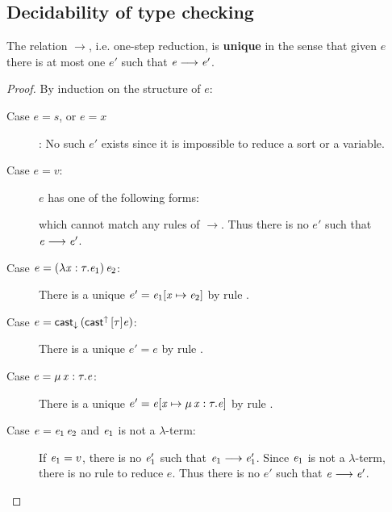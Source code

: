 \subsection{Decidability of type checking}
\begin{lem}\label{lem:unired}
	The relation $ \longrightarrow $, i.e. one-step reduction, is \textbf{unique} in the sense that given $e$ there is at most one $e'$ such that $\mathit{e}  \longrightarrow  \mathit{e'}$.
\end{lem}

\begin{proof}
	By induction on the structure of $e$:
	\begin{description}
	    \item[Case $e=s$, or $e=x$]: No such $e'$ exists since it is impossible to reduce a sort or a variable.
		\item[Case $e=v$:] $e$ has one of the following forms:
		\begin{inparaenum}[(1)]
			\item $\lambda  \ottmv{x}  \ottsym{:}  \tau  \ottsym{.}  \ottnt{e}$,
			\item $\Pi \, \ottmv{x}  \ottsym{:}  \tau_{{\mathrm{1}}}  \ottsym{.}  \tau_{{\mathrm{2}}}$,
			\item $\kw{cast}^{\uparrow} \, \ottsym{[}  \tau  \ottsym{]}  \ottnt{e}$,
		\end{inparaenum}
		which cannot match any rules of $ \longrightarrow $. Thus there is no $e'$ such that $\mathit{e}  \longrightarrow  \mathit{e'}$.
		\item[Case $e=(  \lambda  \mathit{x}  :  \tau  .  \mathit{e_{{\mathrm{1}}}}  ) \, \mathit{e_{{\mathrm{2}}}}$:] There is a unique $e'=\mathit{e_{{\mathrm{1}}}}  [  \mathit{x}  \mapsto  \mathit{e_{{\mathrm{2}}}}  ]$ by rule .
		\item[Case $e=\mathsf{cast}_{\downarrow} \, (  \mathsf{cast}^{\uparrow} \, [  \tau  ]  \mathit{e}  )$:] There is a unique $e'=e$ by rule .
		\item[Case $e=\mu \, \mathit{x}  :  \tau  .  \mathit{e}$:] There is a unique $e'=\mathit{e}  [  \mathit{x}  \mapsto  \mu \, \mathit{x}  :  \tau  .  \mathit{e}  ]$ by rule .
		\item[Case $e=\mathit{e_{{\mathrm{1}}}} \, \mathit{e_{{\mathrm{2}}}}$ and $\mathit{e_{{\mathrm{1}}}}$ is not a $\lambda$-term:] If $\mathit{e_{{\mathrm{1}}}}=v$, there is no $\mathit{e'_{{\mathrm{1}}}}$ such that $\mathit{e_{{\mathrm{1}}}}  \longrightarrow  \mathit{e'_{{\mathrm{1}}}}$. Since $\mathit{e_{{\mathrm{1}}}}$ is not a $\lambda$-term, there is no rule to reduce $e$. Thus there is no $e'$ such that $\mathit{e}  \longrightarrow  \mathit{e'}$.
		

\end{description}
\end{proof}
